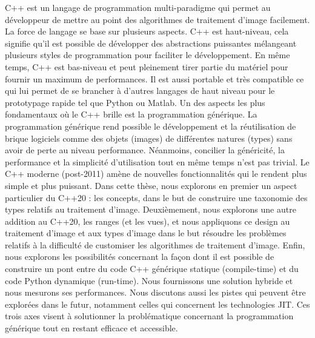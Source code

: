 \documentclass[11pt,a4paper]{book}
\begin{document}
\bigskip

\bigskip

\noindent C++ est un langage de programmation multi-paradigme qui permet au développeur de mettre au point des
algorithmes de traitement d'image facilement. La force de langage se base sur plusieurs aspects. C++ est haut-niveau,
cela signifie qu'il est possible de développer des abstractions puissantes mélangeant plusieurs styles de programmation
pour faciliter le développement. En même temps, C++ est bas-niveau et peut pleinement tirer partie du matériel pour
fournir un maximum de performances. Il est aussi portable et très compatible ce qui lui permet de se brancher à d'autres
langages de haut niveau pour le prototypage rapide tel que Python ou Matlab. Un des aspects les plus fondamentaux où le
C++ brille est la programmation générique. La programmation générique rend possible le développement et la réutilisation
de brique logiciels comme des objets (images) de différentes natures (types) sans avoir de perte au niveau performance.
Néanmoins, concilier la généricité, la performance et la simplicité d'utilisation tout en même temps n'est pas trivial.
Le C++ moderne (post-2011) amène de nouvelles fonctionnalités qui le rendent plus simple et plus puissant. Dans cette
thèse, nous explorons en premier un aspect particulier du C++20 : les concepts, dans le but de construire une taxonomie
des types relatifs au traitement d'image. Deuxièmement, nous explorons une autre addition au C++20, les ranges (et les
vues), et nous appliquons ce design au traitement d'image et aux types d'image dans le but résoudre les problèmes
relatifs à la difficulté de customiser les algorithmes de traitement d'image. Enfin, nous explorons les possibilités
concernant la façon dont il est possible de construire un pont entre du code C++ générique statique (compile-time) et du
code Python dynamique (run-time). Nous fournissons une solution hybride et nous mesurons ses performances. Nous
discutons aussi les pistes qui peuvent être explorées dans le futur, notamment celles qui concernent les technologies
JIT. Ces trois axes visent à solutionner la problématique concernant la programmation générique tout en restant efficace
et accessible.



\tableofcontents
\label{table.of.contents}
\end{document}
